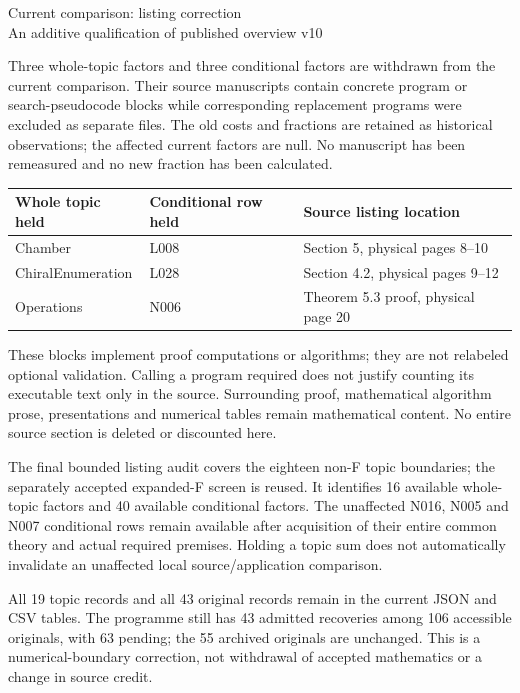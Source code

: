 \documentclass[11pt,a4paper]{article}
\begin{document}
\begin{center}{\Large Current comparison: listing correction}\\[4pt]
An additive qualification of published overview v10\end{center}
Three whole-topic factors and three conditional factors are withdrawn from the current comparison. Their source manuscripts contain concrete program or search-pseudocode blocks while corresponding replacement programs were excluded as separate files. The old costs and fractions are retained as historical observations; the affected current factors are null. No manuscript has been remeasured and no new fraction has been calculated.
\begin{center}\small\begin{tabular}{lll}\toprule
Whole topic held & Conditional row held & Source listing location\\\midrule
Chamber & L008 & Section 5, physical pages 8--10\\
ChiralEnumeration & L028 & Section 4.2, physical pages 9--12\\
Operations & N006 & Theorem 5.3 proof, physical page 20\\\bottomrule
\end{tabular}\end{center}
These blocks implement proof computations or algorithms; they are not relabeled optional validation. Calling a program required does not justify counting its executable text only in the source. Surrounding proof, mathematical algorithm prose, presentations and numerical tables remain mathematical content. No entire source section is deleted or discounted here.

The final bounded listing audit covers the eighteen non-F topic boundaries; the separately accepted expanded-F screen is reused. It identifies 16 available whole-topic factors and 40 available conditional factors. The unaffected N016, N005 and N007 conditional rows remain available after acquisition of their entire common theory and actual required premises. Holding a topic sum does not automatically invalidate an unaffected local source/application comparison.

All 19 topic records and all 43 original records remain in the current JSON and CSV tables. The programme still has 43 admitted recoveries among 106 accessible originals, with 63 pending; the 55 archived originals are unchanged. This is a numerical-boundary correction, not withdrawal of accepted mathematics or a change in source credit.
\end{document}
